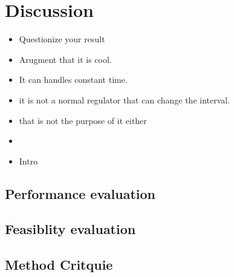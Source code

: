 \section{Discussion}
\begin{itemize}
\item Questionize your result
\item Arugment that it is cool.
\item It can handles constant time.
\item it is not a normal regulator that can change the interval.
\item that is not the purpose of it either
\item 
\end{itemize}
\begin{itemize}
\item Intro
\end{itemize}

\subsection{Performance evaluation}
\subsection{Feasiblity evaluation}
\subsection{Method Critquie}
